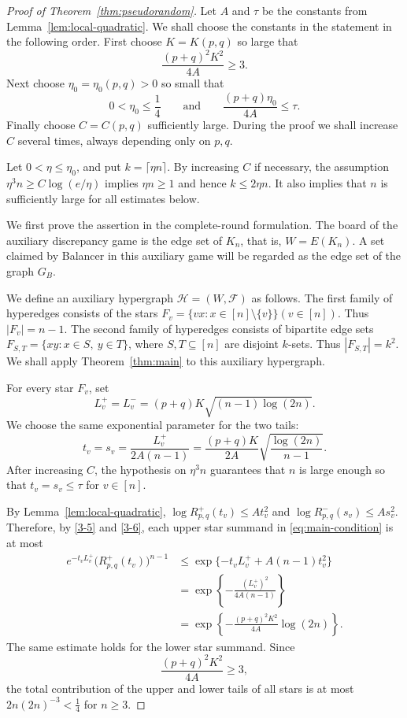 \documentclass[twoside,12pt]{article}
\numberwithin{equation}{section}
\begin{document}
\begin{proof}[Proof of Theorem~\ref{thm:pseudorandom}]
Let $A$ and $\tau$ be the constants from Lemma~\ref{lem:local-quadratic}.
We shall choose the constants in the statement in the following order.  First choose
$K=K(p,q)$ so large that
\[
        \frac{(p+q)^2K^2}{4A}\ge 3.
\]
Next choose $\eta_0=\eta_0(p,q)>0$ so small that
\[
        0<\eta_0\le \frac14
        \qquad\text{and}\qquad
        \frac{(p+q)\eta_0}{4A}\le \tau.
\]
Finally choose $C=C(p,q)$ sufficiently large.  During the proof we shall increase
$C$ several times, always depending only on $p,q$.

Let $0<\eta\le\eta_0$, and put
        $k=\lceil \eta n\rceil$.
By increasing $C$ if necessary, the assumption
$\eta^3 n\ge C\log(e/\eta)$
implies
        $\eta n\ge1$
        and hence 
        $k\le 2\eta n$.
It also implies that $n$ is sufficiently large for all estimates below.

We first prove the assertion in the complete-round formulation.  The board of the
auxiliary discrepancy game is the edge set of $K_n$, that is, $W=E(K_n)$.
A set claimed by Balancer in this auxiliary game will be regarded as the edge set
of the graph $G_B$.

We define an auxiliary hypergraph
$\mathcal H=(W,\mathcal F)$
as follows.  The first family of hyperedges consists of the stars
$F_v=\{vx:x\in[n]\setminus\{v\}\}
  (v\in[n])$.
Thus
        $|F_v|=n-1$.
The second family of hyperedges consists of bipartite edge sets
$F_{S,T}=\{xy:x\in S,\ y\in T\}$,
where $S,T\subseteq[n]$ are disjoint $k$-sets. Thus
        $|F_{S,T}|=k^2$.
We shall apply Theorem~\ref{thm:main} to this auxiliary hypergraph.

For every star $F_v$, set
\begin{equation}\label{3-5}
L_v^+=L_v^-=(p+q)K\sqrt{(n-1)\log(2n)}.
\end{equation}
We choose the same exponential parameter for the two tails:
\begin{equation}\label{3-6}
t_v=s_v=
        \frac{L_v^+}{2A(n-1)}
        =
        \frac{(p+q)K}{2A}
        \sqrt{\frac{\log(2n)}{n-1}}.
\end{equation}
After increasing $C$, the hypothesis on $\eta^3 n$ guarantees that
$n$ is large enough so that
$t_v=s_v\le\tau$
for $v\in[n]$.

By Lemma~\ref{lem:local-quadratic},
$\log R^+_{p,q}(t_v)\le A t_v^2$ and $\log R^-_{p,q}(s_v)\le A s_v^2$. 
Therefore, by \eqref{3-5} and \eqref{3-6}, each upper star summand in \eqref{eq:main-condition} is at most
\[
\begin{aligned}
        e^{-t_vL_v^+}
        \bigl(R^+_{p,q}(t_v)\bigr)^{n-1}
        &\le
        \exp\{-t_vL_v^+ + A(n-1)t_v^2\}  \\
        &=
        \exp\left\{
        -\frac{(L_v^+)^2}{4A(n-1)}
        \right\}  \\
        &=
        \exp\left\{
        -\frac{(p+q)^2K^2}{4A}\log(2n)
        \right\}.
\end{aligned}
\]
The same estimate holds for the lower star summand.  Since
\[
        \frac{(p+q)^2K^2}{4A}\ge3,
\]
the total contribution of the upper and lower tails of all stars is at most
$2n(2n)^{-3}<\frac14$
for $n\ge3$.



\end{proof}
\end{document}
